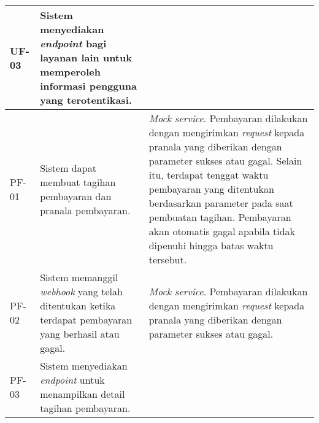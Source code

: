 \begin{longtable}{|l|p{}|p{}|}
    \hline
    UF-03       & Sistem menyediakan \textit{endpoint} bagi layanan lain untuk memperoleh informasi pengguna yang terotentikasi.                                                                                                                  &                                                                                                                                                                                                                                                                                                                                                       \\
    \hline
    \hline
    PF-01       & Sistem dapat membuat tagihan pembayaran dan pranala pembayaran.                                                                                                                                                                 & \textit{Mock service}. Pembayaran dilakukan dengan mengirimkan \textit{request} kepada pranala yang diberikan dengan parameter sukses atau gagal. Selain itu, terdapat tenggat waktu pembayaran yang ditentukan berdasarkan parameter pada saat pembuatan tagihan. Pembayaran akan otomatis gagal apabila tidak dipenuhi hingga batas waktu tersebut. \\
    \hline
    \hline
    PF-02       & Sistem memanggil \textit{webhook} yang telah ditentukan ketika terdapat pembayaran yang berhasil atau gagal.                                                                                                                    & \textit{Mock service}. Pembayaran dilakukan dengan mengirimkan \textit{request} kepada pranala yang diberikan dengan parameter sukses atau gagal.                                                                                                                                                                                                     \\
    \hline
    \hline
    PF-03       & Sistem menyediakan \textit{endpoint} untuk menampilkan detail tagihan pembayaran.                                                                                                                                               &                                                                                                                                                                                                                                                                                                                                                       \\
    \hline
\end{longtable}
\endgroup

